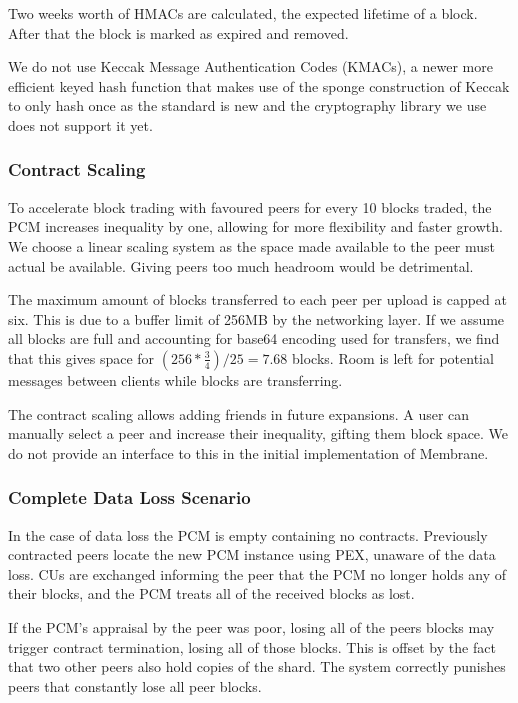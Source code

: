 \documentclass[11pt, a4paper, twocolumn, twoside]{report}
\begin{document}
Two weeks worth of HMACs are calculated, the expected lifetime of a block. After that the block is marked as expired and removed.

We do not use Keccak Message Authentication Codes (KMACs), a newer more efficient keyed hash function that makes use of the sponge construction of Keccak to only hash once \citep{kelsey2016sha} as the standard is new and the cryptography library we use does not support it yet.

\subsubsection{Contract Scaling}

To accelerate block trading with favoured peers for every 10 blocks traded, the PCM increases inequality by one, allowing for more flexibility and faster growth. We choose a linear scaling system as the space made available to the peer must actual be available. Giving peers too much headroom would be detrimental. 

The maximum amount of blocks transferred to each peer per upload is capped at six. This is due to a buffer limit of 256MB by the networking layer. If we assume all blocks are full and accounting for base64 encoding used for transfers, we find that this gives space for $(256 * \frac{3}{4}) / 25 = 7.68$ blocks. Room is left for potential messages between clients while blocks are transferring.

The contract scaling allows adding friends in future expansions. A user can manually select a peer and increase their inequality, gifting them block space. We do not provide an interface to this in the initial implementation of Membrane.

\subsubsection{Complete Data Loss Scenario}

In the case of data loss the PCM is empty containing no contracts. Previously contracted peers locate the new PCM instance using PEX, unaware of the data loss. CUs are exchanged informing the peer that the PCM no longer holds any of their blocks, and the PCM treats all of the received blocks as lost.

If the PCM's appraisal by the peer was poor, losing all of the peers blocks may trigger contract termination, losing all of those blocks. This is offset by the fact that two other peers also hold copies of the shard. The system correctly punishes peers that constantly lose all peer blocks.
\end{document}
